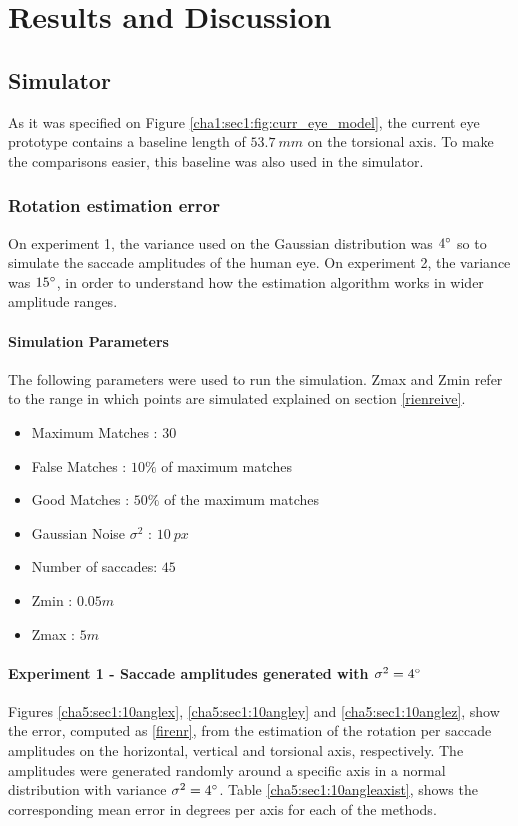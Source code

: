 
\chapter{Results and Discussion}
\label{cha4:results}
\section{Simulator}
As it was specified on Figure \ref{cha1:sec1:fig:curr_eye_model}, the current eye prototype contains a baseline length of $53.7 \ mm$ on the torsional axis. To make the comparisons easier, this baseline was also used in the simulator.
\subsection{Rotation estimation error}
On experiment 1, the variance used on the Gaussian distribution was $4 \degree$ so to simulate the saccade amplitudes of the human eye. On experiment 2, the variance was $15 \degree$, in order to understand how the estimation algorithm works in wider amplitude ranges.
\subsubsection{Simulation Parameters}
The following parameters were used to run the simulation. Zmax and Zmin refer to the range in which points are simulated explained on section \ref{rienreive}.
\begin{itemize}
	\item Maximum Matches : $30$
	\item False Matches : $10 \%$ of maximum matches
	\item Good Matches : $50 \%$ of the maximum matches
	\item Gaussian Noise $\sigma^2$ : $10 \ px$
	\item Number of saccades: $45$
	\item Zmin : $0.05 m$
	\item Zmax : $5 m$
\end{itemize}
\subsubsection{Experiment 1 - Saccade amplitudes generated with $\sigma^2 = 4 \degree $}
Figures \ref{cha5:sec1:10anglex}, \ref{cha5:sec1:10angley} and \ref{cha5:sec1:10anglez}, show the error, computed as \ref{firenr}, from the estimation of the rotation per saccade amplitudes on the horizontal, vertical and torsional axis, respectively. The amplitudes were generated randomly around a specific axis in a normal distribution with variance $\sigma^2 = 4 \degree$. Table \ref{cha5:sec1:10angleaxist}, shows the corresponding mean error in degrees per axis for each of the methods.

